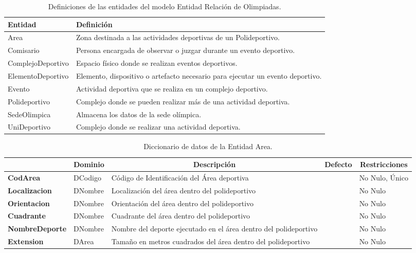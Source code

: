 \begin{table}[H]
\centering
\caption{Definiciones de las entidades del modelo Entidad Relación de Olimpiadas.}
\renewcommand{\arraystretch}{1.5}%
\label{tab-Dicc-10}
\begin{tabular}{@{}ll@{}}
\toprule
\textbf{Entidad}  & \textbf{Definición}\\ \midrule
Area    & Zona destinada a las actividades deportivas de un Polideportivo. \\
Comisario  & Persona encargada de observar o juzgar durante un evento deportivo.\\
ComplejoDeportivo & Espacio físico donde se realizan eventos deportivos.\\
ElementoDeportivo & Elemento, dispositivo o artefacto necesario para ejecutar un evento deportivo.\\
Evento & Actividad deportiva que se realiza en un complejo deportivo.\\
Polideportivo & Complejo donde se pueden realizar más de una actividad deportiva.\\
SedeOlimpica & Almacena los datos de la sede olímpica.\\
UniDeportivo & Complejo donde se realizar una actividad deportiva.\\ \bottomrule
\end{tabular}
\end{table}

\begin{table}[H]
\centering
\caption{Diccionario de datos de la Entidad Area.}
\label{tab-Dicc-11}
\begin{tabular}{>{\bfseries}m{4.0cm}>{}m{3.0cm}>{}m{6.0cm}>{}m{5.0cm}>{}m{2.0cm}}
\toprule
\multicolumn{1}{c}{\textbf{Atributo}} & \multicolumn{1}{c}{\textbf{Dominio}} & \multicolumn{1}{c}{\textbf{Descripción}} & \multicolumn{1}{c}{\textbf{Defecto}} & \multicolumn{1}{c}{\textbf{Restricciones}} \\ \midrule
CodArea    & DCodigo   & Código de Identificación  del Área deportiva &   & No Nulo, Único\\
Localizacion    & DNombre   & Localización del área dentro del polideportivo &   & No Nulo\\
Orientacion    & DNombre   & Orientación  del área dentro del polideportivo &   & No Nulo\\
Cuadrante    & DNombre   & Cuadrante del área dentro del polideportivo &   & No Nulo\\
NombreDeporte    & DNombre   & Nombre del deporte ejecutado en el área dentro del polideportivo &   & No Nulo\\
Extension & DArea   & Tamaño en metros cuadrados del área dentro del polideportivo  &   & No Nulo\\ \bottomrule
\end{tabular}
\end{table}

